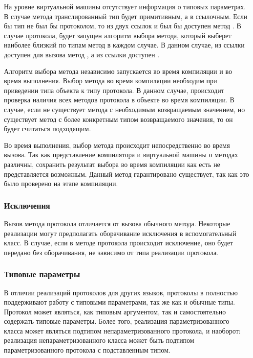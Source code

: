 На уровне виртуальной машины отсутствует информация о типовых параметрах. В случае метода  транслированный тип будет примитивным, а в  ссылочным. Если бы тип  не был бы протоколом, то из двух ссылок  и  был бы доступен метод . В случае протокола, будет запущен алгоритм выбора метода, который выберет наиболее близкий по типам метод в каждом случае. В данном случае, из ссылки  доступен для вызова метод , а из ссылки  доступен .

Алгоритм выбора метода независимо запускается во время компиляции и во время выполнения. Выбор метода во время компиляции необходим при приведении типа объекта к типу протокола. В данном случае, происходит проверка наличия всех методов протокола в объекте во время компиляции. В случае, если не существует метода с необходимым возвращаемым значением, но существует метод с более конкретным типом возвращаемого значения, то он будет считаться подходящим.

Во время выполнения, выбор метода происходит непосредственно во время вызова. Так как представление компилятора и виртуальной машины о методах различны, сохранить результат выбора во время компиляции как есть не представляется возможным. Данный метод гарантировано существует, так как это было проверено на этапе компиляции.

\subsubsection{Исключения}
Вызов метода протокола отличается от вызова обычного метода. Некоторые реализации могут предполагать оборачивание исключения в вспомогательный класс. В случае, если в методе протокола происходит исключение, оно будет передано без оборачивания, не зависимо от типа реализации протокола.

\subsubsection{Типовые параметры}
В отличии реализаций протоколов для других  языков, протоколы в  полностью поддерживают работу с типовыми параметрами, так же как и обычные типы. Протокол может являться, как типовым аргументом, так и самостоятельно содержать типовые параметры. Более того, реализация параметризованного класса может являться подтипом непараметризованного протокола, и наоборот: реализация непараметризованного класса может быть подтипом параметризованного протокола с подставленным типом.

